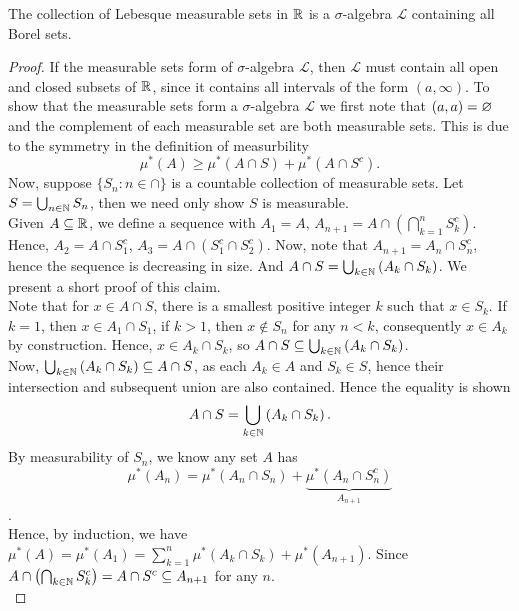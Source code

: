 \begin{proposition}
	The collection of Lebesque measurable sets in \(\mathbb{R}\) is a \(\sigma\)-algebra \(\mathscr{L}\) containing all Borel sets.
\end{proposition}
\begin{proof}
	If the measurable sets form of \(\sigma\)-algebra \(\mathscr{L}\), then \(\mathscr{L}\) must contain all open and closed subsets of \(\mathbb{R}\), since it contains all intervals of the form \(\left( a, \infty \right) \). To show that the measurable sets form a \(\sigma\)-algebra \(\mathscr{L}\) we first note that \(\left( a, a \right)  = \varnothing\) and the complement of each measurable set are both measurable sets. This is due to the symmetry in the definition of measurbility
	\[
		\mu^{*}\left( A \right)  \ge \mu^{*}\left( A \cap S \right) + \mu^{*}\left( A \cap S^{c} \right)
	.\]
Now, suppose \(\{S_{n} : n \in \cap\} \) is a countable collection of measurable sets. Let \(S = \bigcup_{n \in \mathbb{N}} S_{n}\), then we need only show \(S\) is measurable.\\
Given \(A \subseteq \mathbb{R}\), we define a sequence with \(A_1 = A\), \(A_{n + 1} = A \cap \left( \bigcap_{k=1}^{n} S_{k}^{c} \right) \). Hence, \(A_2 = A \cap S_1^{c}\), \(A_3 = A \cap \left( S_1 ^{c} \cap S_2^{c} \right) \). Now, note that \(A_{n+1} = A_{n} \cap S_{n}^{c}\), hence the sequence is decreasing in size. And \(A \cap S = \bigcup_{k \in \mathbb{N}} \left( A_{k} \cap S_{k} \right) \). We present a short proof of this claim.\\
Note that for \(x \in A \cap S\), there is a smallest positive integer \(k\) such that \(x \in S_{k}\). If \(k=1\), then \(x \in A_1 \cap S_1\), if \(k > 1\), then \(x\not\in S_{n}\) for any \( n < k\), consequently \(x \in A_{k}\) by construction. Hence, \(x \in A_{k} \cap S_{k}\), so \(A \cap S \subseteq \bigcup_{k \in \mathbb{N}} \left( A_{k} \cap S_{k} \right) \).\\
Now, \(\bigcup_{k \in \mathbb{N}} \left( A_{k} \cap S_{k} \right) \subseteq A \cap S \), as each \(A_{k} \in A\) and \(S_{k} \in S\), hence their intersection and subsequent union are also contained. Hence the equality is shown \[
	A \cap S = \bigcup_{ k \in \mathbb{N}}  \left( A_{k} \cap S_{k} \right)
.\]
By measurability of \(S_{n}\), we know any set \(A\) has \[ \mu^{*}\left( A_{n} \right)  = \mu^{*}\left( A_{n} \cap S_{n} \right)  + \underbrace{\mu^{*}\left( A_{n} \cap S_{n}^{c} \right)}_{A_{n + 1}} \].\\
Hence, by induction, we have \( \mu^{*}\left( A \right) = \mu^{*}\left( A_1 \right) = \sum_{k= 1}^{n}  \mu^{*}\left( A_{k} \cap  S_{k} \right) + \mu^{*}\left( A_{n+1} \right) \). Since \(A \cap \left( \bigcap_{k \in \mathbb{N}} S_{k}^{c}  \right) = A\cap S^{c}	\subseteq A_{n + 1} \) for any \(n\).\\

\end{proof}
